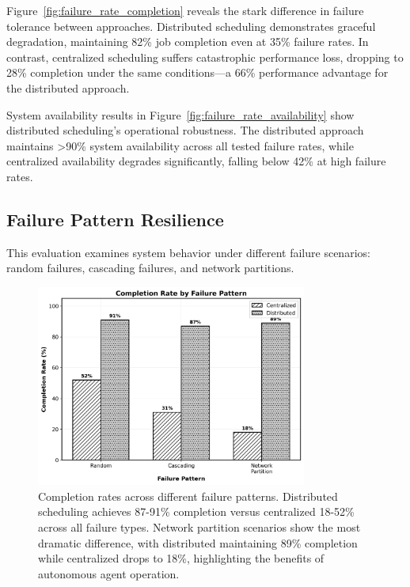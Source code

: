 \documentclass[conference]{IEEEtran}
\begin{document}
Figure~\ref{fig:failure_rate_completion} reveals the stark difference in failure tolerance between approaches. Distributed scheduling demonstrates graceful degradation, maintaining 82\% job completion even at 35\% failure rates. In contrast, centralized scheduling suffers catastrophic performance loss, dropping to 28\% completion under the same conditions—a 66\% performance advantage for the distributed approach.

System availability results in Figure~\ref{fig:failure_rate_availability} show distributed scheduling's operational robustness. The distributed approach maintains >90\% system availability across all tested failure rates, while centralized availability degrades significantly, falling below 42\% at high failure rates.

\subsection{Failure Pattern Resilience}

This evaluation examines system behavior under different failure scenarios: random failures, cascading failures, and network partitions.

\begin{figure}[!t]
\centering
\includegraphics[width=3.5in]{figure5_failure_pattern_completion.png}
\caption{Completion rates across different failure patterns. Distributed scheduling achieves 87-91\% completion versus centralized 18-52\% across all failure types. Network partition scenarios show the most dramatic difference, with distributed maintaining 89\% completion while centralized drops to 18\%, highlighting the benefits of autonomous agent operation.}
\label{fig:failure_pattern_completion}
\end{figure}
\end{document}
